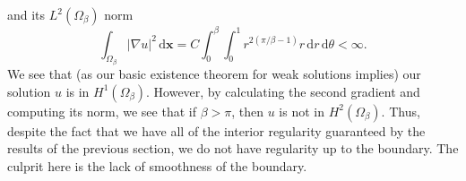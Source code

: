 \begin{Example}
\begin{equation}
\end{equation}
and its $L^2(\Omega_\beta)$ norm
\begin{equation}\label{eq:corner-example-finite-gradient-l2-norm}
\int_{\Omega_\beta}|\nabla u|^2\,\mathrm{d}\bm{x}=C\int_0^\beta\int_0^1r^{2(\pi/\beta-1)}r\,\mathrm{d}r\,\mathrm{d}\theta<\infty.
\end{equation}
We see that (as our basic existence theorem for weak solutions implies) our solution $u$ is in $H^1(\Omega_\beta)$. However, by calculating the second gradient and computing its norm, we see that if $\beta>\pi$, then $u$ is not in $H^2(\Omega_\beta)$. Thus, despite the fact that we have all of the interior regularity guaranteed by the results of the previous section, we do not have regularity up to the boundary. The culprit here is the lack of smoothness of the boundary.
\end{Example}
